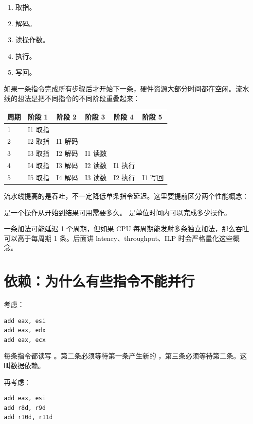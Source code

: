 \begin{enumerate}
  \item 取指。
  \item 解码。
  \item 读操作数。
  \item 执行。
  \item 写回。
\end{enumerate}

如果一条指令完成所有步骤后才开始下一条，硬件资源大部分时间都在空闲。流水线的想法是把不同指令的不同阶段重叠起来：

\begin{center}
\begin{tabular}{llllll}
\toprule
周期 & 阶段 1 & 阶段 2 & 阶段 3 & 阶段 4 & 阶段 5 \\
\midrule
1 & I1 取指 & & & & \\
2 & I2 取指 & I1 解码 & & & \\
3 & I3 取指 & I2 解码 & I1 读数 & & \\
4 & I4 取指 & I3 解码 & I2 读数 & I1 执行 & \\
5 & I5 取指 & I4 解码 & I3 读数 & I2 执行 & I1 写回 \\
\bottomrule
\end{tabular}
\end{center}

流水线提高的是吞吐，不一定降低单条指令延迟。这里要提前区分两个性能概念：

 是一个操作从开始到结果可用需要多久。  是单位时间内可以完成多少操作。

一条加法可能延迟 1 个周期，但如果 CPU 每周期能发射多条独立加法，那么吞吐可以高于每周期 1 条。后面讲 latency、throughput、ILP 时会严格量化这些概念。

\section{依赖：为什么有些指令不能并行}

考虑：

\begin{lstlisting}
add eax, esi
add eax, edx
add eax, ecx
\end{lstlisting}

每条指令都读写 。第二条必须等待第一条产生新的 ，第三条必须等待第二条。这叫数据依赖。

再考虑：

\begin{lstlisting}
add eax, esi
add r8d, r9d
add r10d, r11d
\end{lstlisting}

